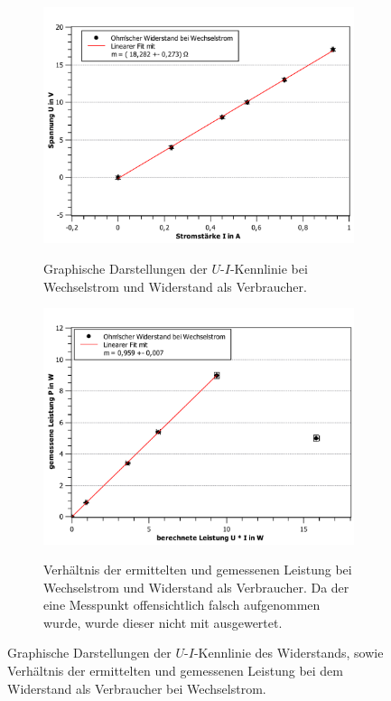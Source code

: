 \begin{figure}[ht]
	
	\centering	
	\begin{subfigure}{0.70\textwidth}
		\centering
		\includegraphics[width=\textwidth]{auswertung/widerstand_wechselstrom_Widerstand.pdf}
		\label{fig:3}
		\caption{Graphische Darstellungen der $U$-$I$-Kennlinie bei Wechselstrom und Widerstand als Verbraucher.}	
	\end{subfigure}
	\begin{subfigure}{0.70\textwidth}
		\centering
		\includegraphics[width=\textwidth]{auswertung/widerstand_wechselstrom_Leistung.pdf}
		\label{fig:4}
		\caption{Verhältnis der ermittelten und gemessenen Leistung bei Wechselstrom und Widerstand als Verbraucher. Da der eine Messpunkt offensichtlich falsch aufgenommen wurde, wurde dieser nicht mit ausgewertet.}	
	\end{subfigure}
	\caption{Graphische Darstellungen der $U$-$I$-Kennlinie des Widerstands, sowie Verhältnis der ermittelten und gemessenen Leistung bei dem Widerstand als Verbraucher bei Wechselstrom.}
	\label{fig:R_wechsel}
\end{figure}

